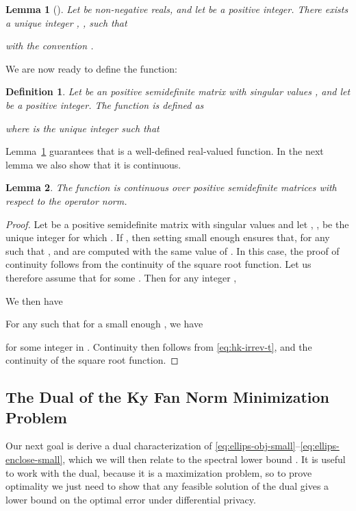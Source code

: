 \documentclass{article}
\newtheorem{definition}{Definition}[section]
\newtheorem{lemma}{Lemma}[theorem]
\begin{document}
\begin{lemma}[\cite{simplex}]\label{lm:singvals-thresh}
  Let  be non-negative reals,
  and let  be a positive integer. There exists a unique integer
  , , such that
  
  with the convention . 
\end{lemma}

We are now ready to define the function:
\begin{definition}
  Let  be an  positive semidefinite
  matrix with singular values , and
  let  be a positive integer. The function  is
  defined as
  
  where  is the unique integer such that 
  
\end{definition}
Lemma~\ref{lm:singvals-thresh} guarantees that  is a
well-defined real-valued function. In the next lemma we also show that
it is continuous.

\begin{lemma}\label{lm:hk-contin}
  The function  is continuous over positive semidefinite
  matrices with respect to the operator norm.  
\end{lemma}
\begin{proof}
  Let  be a  positive semidefinite matrix with singular
  values  and let , , be the
  unique integer for which . If , then setting  small enough ensures that, for
  any  such that ,  and  are
  computed with the same value of . In this case, the proof of
  continuity follows from the continuity of the square root
  function. Let us therefore assume that  for some . Then  for any integer ,
  
  We then have
  
  For any  such that  for a small enough
  , we have
  
for some integer   in . Continuity then follows from
  \eqref{eq:hk-irrev-t}, and the
  continuity of the square root function. 
\end{proof}


\subsection{The Dual of the Ky Fan Norm Minimization Problem}

Our next goal is derive a dual characterization of
\eqref{eq:ellips-obj-small}--\eqref{eq:ellips-enclose-small}, which we
will then relate to the spectral lower bound . It is
useful to work with the dual, because it is a maximization problem, so
to prove optimality we just need to show that any feasible solution of
the dual gives a lower bound on the optimal error under differential
privacy.
\end{document}
